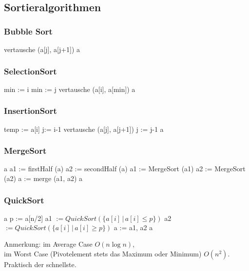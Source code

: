 \documentclass[fleqn]{scrartcl}
\begin{document}
\subsection{Sortieralgorithmen}
\subsubsection{Bubble Sort}
\begin{algorithmic}
\State vertausche (a[j], a[j+1])
\EndIf
\EndFor
\EndFor
\State \Return a
\end{algorithmic}

\subsubsection{SelectionSort}
\begin{algorithmic}
\State min := i
\State min := j
\EndIf
\EndFor
\State vertausche (a[i], a[min])
\EndFor
\State \Return a
\end{algorithmic}
\subsubsection{InsertionSort}
\begin{algorithmic}
\State temp := a[i]
\State j:= i-1
\State vertausche (a[j], a[j+1])
\State j := j-1
\EndWhile
\EndFor
\State \Return a
\end{algorithmic}
\subsubsection{MergeSort}
\begin{algorithmic}
\State \Return a
\EndIf
\State a1 := firstHalf (a)
\State a2 := secondHalf (a)
\State a1 := MergeSort (a1)
\State a2 := MergeSort (a2)
\State a := merge (a1, a2)
\State \Return a
\end{algorithmic}
\subsubsection{QuickSort}
\begin{algorithmic}
\State \Return a
\EndIf
\State p := a[n/2]
\State a1  $:= QuickSort(\{a[i] \, |\, a[i] \leq p\})$
\State a2 $:= QuickSort(\{a[i] \, |\, a[i] \geq p\})$
\State a := {a1, a2}
\State \Return a
\end{algorithmic}
Anmerkung: im Average Case $O (n \log n)$,\\ im Worst Case (Pivotelement stets das Maximum oder Minimum) $O (n^{2})$.\\ Praktisch der schnellste.
\end{document}
